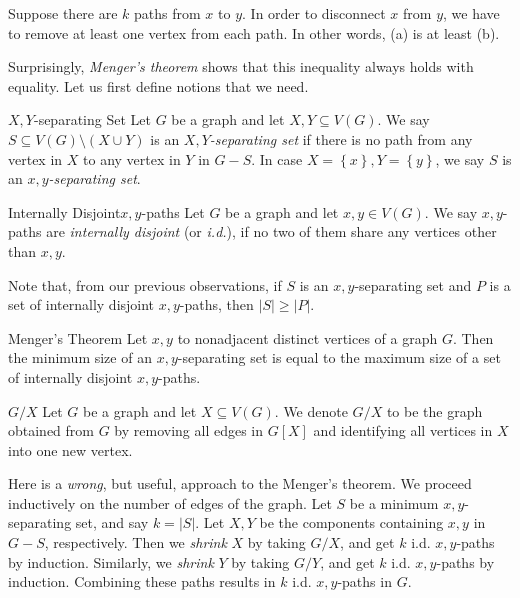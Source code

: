 \documentclass[co342]{subfiles}
\begin{document}
    \begin{subproof}
        Suppose there are $k$ paths from $x$ to $y$. In order to disconnect $x$ from $y$, we have to remove at least one vertex from each path. In other words, (a) is at least (b). 
    \end{subproof}
    
    \noindent Surprisingly, \textit{Menger's theorem} shows that this inequality always holds with equality. Let us first define notions that we need.
    
    \begin{definition}{$X,Y$-separating Set}{}
        Let $G$ be a graph and let $X,Y\subseteq V\left( G \right)$. We say $S\subseteq V\left( G \right)\setminus\left( X\cup Y \right)$ is an \emph{$X,Y$-separating set} if there is no path from any vertex in $X$ to any vertex in $Y$ in $G-S$. In case $X=\left\lbrace x \right\rbrace,Y=\left\lbrace y \right\rbrace$, we say $S$ is an \emph{$x,y$-separating set}.
    \end{definition}

    \begin{definition}{Internally Disjoint}{$x,y$-paths}
        Let $G$ be a graph and let $x,y\in V\left( G \right)$. We say $x,y$-paths are \emph{internally disjoint} (or \emph{i.d.}), if no two of them share any vertices other than $x,y$.
    \end{definition}

    \noindent Note that, from our previous observations, if $S$ is an $x,y$-separating set and $P$ is a set of internally disjoint $x,y$-paths, then $\left| S \right| \geq \left| P \right|$.

    \begin{theorem}{Menger's Theorem}
        Let $x,y$ to nonadjacent distinct vertices of a graph $G$. Then the minimum size of an $x,y$-separating set is equal to the maximum size of a set of internally disjoint $x,y$-paths.
    \end{theorem}

    \begin{notation}{$G /X$}{}
        Let $G$ be a graph and let $X\subseteq V\left( G \right)$. We denote $G /X$ to be the graph obtained from $G$ by removing all edges in $G\left[ X \right]$ and identifying all vertices in $X$ into one new vertex.
    \end{notation}

    Here is a \textit{wrong}, but useful, approach to the Menger's theorem. We proceed inductively on the number of edges of the graph. Let $S$ be a minimum $x,y$-separating set, and say $k=\left| S \right|$. Let $X,Y$ be the components containing $x,y$ in $G-S$, respectively. Then we \textit{shrink} $X$ by taking $G /X$, and get $k$ i.d. $x,y$-paths by induction. Similarly, we \textit{shrink} $Y$ by taking $G /Y$, and get $k$ i.d. $x,y$-paths by induction. Combining these paths results in $k$ i.d. $x,y$-paths in $G$.
\end{document}
